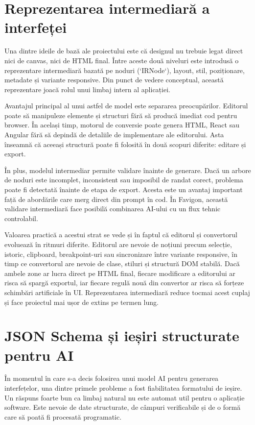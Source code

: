 \section{Reprezentarea intermediară a interfeței}

Una dintre ideile de bază ale proiectului este că designul nu trebuie legat direct nici de canvas, nici de HTML final. Între aceste două niveluri este introdusă o reprezentare intermediară bazată pe noduri (`IRNode`), layout, stil, poziționare, metadate și variante responsive. Din punct de vedere conceptual, această reprezentare joacă rolul unui limbaj intern al aplicației.

Avantajul principal al unui astfel de model este separarea preocupărilor. Editorul poate să manipuleze elemente și structuri fără să producă imediat cod pentru browser. În același timp, motorul de conversie poate genera HTML, React sau Angular fără să depindă de detaliile de implementare ale editorului. Asta înseamnă că aceeași structură poate fi folosită în două scopuri diferite: editare și export.

În plus, modelul intermediar permite validare înainte de generare. Dacă un arbore de noduri este incomplet, inconsistent sau imposibil de randat corect, problema poate fi detectată înainte de etapa de export. Acesta este un avantaj important față de abordările care merg direct din prompt în cod. În Favigon, această validare intermediară face posibilă combinarea AI-ului cu un flux tehnic controlabil.

Valoarea practică a acestui strat se vede și în faptul că editorul și convertorul evoluează în ritmuri diferite. Editorul are nevoie de noțiuni precum selecție, istoric, clipboard, breakpoint-uri sau sincronizare între variante responsive, în timp ce convertorul are nevoie de clase, stiluri și structură DOM stabilă. Dacă ambele zone ar lucra direct pe HTML final, fiecare modificare a editorului ar risca să spargă exportul, iar fiecare regulă nouă din convertor ar risca să forțeze schimbări artificiale în UI. Reprezentarea intermediară reduce tocmai acest cuplaj și face proiectul mai ușor de extins pe termen lung.

\section{JSON Schema și ieșiri structurate pentru AI}

În momentul în care s-a decis folosirea unui model AI pentru generarea interfețelor, una dintre primele probleme a fost fiabilitatea formatului de ieșire. Un răspuns foarte bun ca limbaj natural nu este automat util pentru o aplicație software. Este nevoie de date structurate, de câmpuri verificabile și de o formă care să poată fi procesată programatic.

